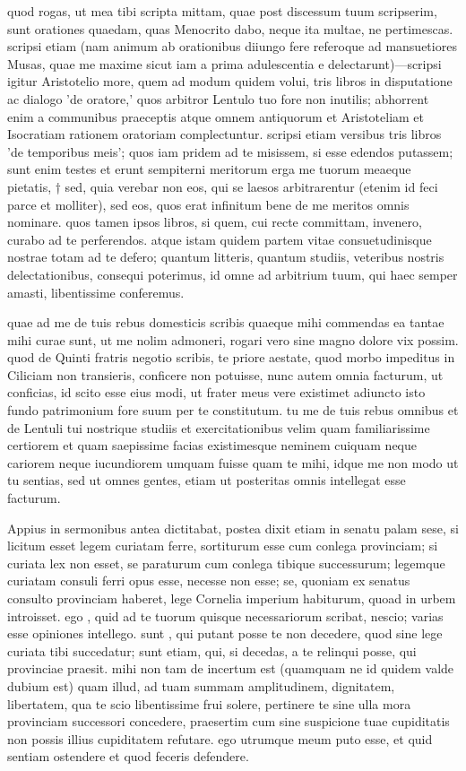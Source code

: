  quod rogas, ut mea tibi scripta mittam, quae post discessum tuum scripserim, sunt orationes quaedam, quas Menocrito dabo, neque ita multae, ne pertimescas. scripsi etiam (nam animum ab orationibus diiungo fere referoque ad mansuetiores Musas, quae me maxime sicut iam a prima adulescentia e delectarunt)—scripsi igitur Aristotelio more, quem ad modum quidem volui, tris libros in disputatione ac dialogo 'de oratore,' quos arbitror Lentulo tuo fore non inutilis; abhorrent enim a communibus praeceptis atque omnem antiquorum et Aristoteliam et Isocratiam rationem oratoriam complectuntur. scripsi etiam versibus tris libros 'de temporibus meis'; quos iam pridem ad te misissem, si esse edendos putassem; sunt enim testes et erunt sempiterni meritorum erga me tuorum meaeque pietatis, † sed, quia verebar non eos, qui se laesos arbitrarentur (etenim id feci parce et molliter), sed eos, quos erat infinitum bene de me meritos omnis nominare. quos tamen ipsos libros, si quem, cui recte committam, invenero, curabo ad te perferendos. atque istam quidem partem vitae consuetudinisque nostrae totam ad te defero; quantum litteris, quantum studiis, veteribus nostris delectationibus, consequi poterimus, id omne ad arbitrium tuum, qui haec semper amasti, libentissime conferemus.

 quae ad me de tuis rebus domesticis scribis quaeque mihi commendas ea tantae mihi curae sunt, ut me nolim admoneri, rogari vero sine magno dolore vix possim. quod de Quinti fratris negotio scribis, te priore aestate, quod morbo impeditus in Ciliciam non transieris, conficere non potuisse, nunc autem omnia facturum, ut conficias, id scito esse eius modi, ut frater meus vere existimet adiuncto isto fundo patrimonium fore suum per te constitutum. tu me de tuis rebus omnibus et de Lentuli tui nostrique studiis et exercitationibus velim quam familiarissime certiorem et quam saepissime facias existimesque neminem cuiquam neque cariorem neque iucundiorem umquam fuisse quam te mihi, idque me non modo ut tu sentias, sed ut omnes gentes, etiam ut posteritas omnis intellegat esse facturum.

 Appius in sermonibus antea dictitabat, postea dixit etiam in senatu palam sese, si licitum esset legem curiatam ferre, sortiturum esse cum conlega provinciam; si curiata lex non esset, se paraturum cum conlega tibique successurum; legemque curiatam consuli ferri opus esse, necesse non esse; se, quoniam ex senatus consulto provinciam haberet, lege Cornelia imperium habiturum, quoad in urbem introisset. ego , quid ad te tuorum quisque necessariorum scribat, nescio; varias esse opiniones intellego. sunt , qui putant posse te non decedere, quod sine lege curiata tibi succedatur; sunt etiam, qui, si decedas, a te relinqui posse, qui provinciae praesit. mihi non tam de incertum est (quamquam ne id quidem valde dubium est) quam illud, ad tuam summam amplitudinem, dignitatem, libertatem, qua te scio libentissime frui solere, pertinere te sine ulla mora provinciam successori concedere, praesertim cum sine suspicione tuae cupiditatis non possis illius cupiditatem refutare. ego utrumque meum puto esse, et quid sentiam ostendere et quod feceris defendere.

